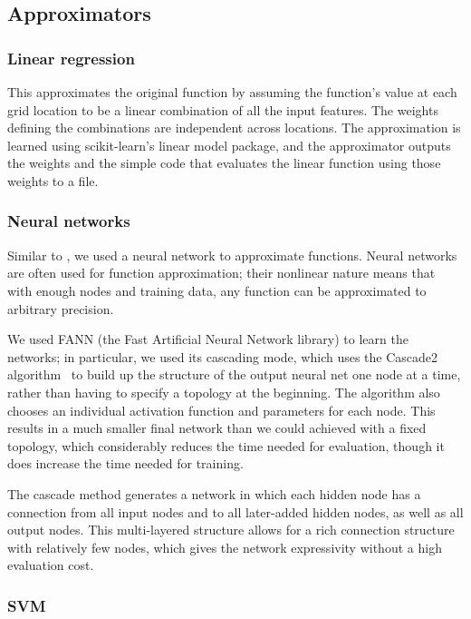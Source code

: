 \documentclass{article}
\begin{document}
\subsection{Approximators}

\subsubsection{Linear regression}
This approximates the original function by assuming the function's value at each grid location to be a linear combination of all the input features. The weights defining the combinations are independent across locations. The approximation is learned using scikit-learn's linear model package, and the approximator outputs the weights and the simple code that evaluates the linear function using those weights to a file.

\subsubsection{Neural networks}

Similar to \cite{Esmaeilzadeh12}, we used a neural network to approximate functions. Neural networks are often used for function approximation; their nonlinear nature means that with enough nodes and training data, any function can be approximated to arbitrary precision.

We used FANN (the Fast Artificial Neural Network library) to learn the networks; in particular, we used its cascading mode, which uses the Cascade2 algorithm~\cite{fahlman} to build up the structure of the output neural net one node at a time, rather than having to specify a topology at the beginning. The algorithm also chooses an individual activation function and parameters for each node. This results in a much smaller final network than we could achieved with a fixed topology, which considerably reduces the time needed for evaluation, though it does increase the time needed for training.

The cascade method generates a network in which each hidden node has a connection from all input nodes and to all later-added hidden nodes, as well as all output nodes. This multi-layered structure allows for a rich connection structure with relatively few nodes, which gives the network expressivity without a high evaluation cost.

\subsubsection{SVM}
\end{document}
